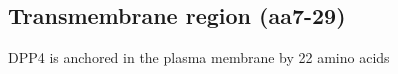 \subsection{Transmembrane region (aa7-29)}

DPP4 is anchored in the plasma membrane by 22 amino acids 